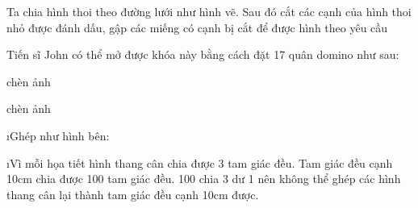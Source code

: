 \begin{Answer}{85}
		Ta chia hình thoi theo đường lưới như hình vẽ. Sau đó cắt các cạnh của hình thoi nhỏ được đánh dấu, gập các miếng có cạnh bị cắt để được hình theo yêu cầu
	
\end{Answer}
\begin{Answer}{86}
		Tiến sĩ John có thể mở được khóa này bằng cách đặt 17 quân domino như sau:
	
\end{Answer}
\begin{Answer}{87}
		chèn ảnh
	
\end{Answer}
\begin{Answer}{88}
		chèn ảnh
	
\end{Answer}
\begin{Answer}{89}
		\begin{enumerate}[a), leftmargin=*]
			\i Ghép như hình bên:
			
			\i Vì mỗi họa tiết hình thang cân chia được 3 tam giác đều. Tam giác đều cạnh 10cm chia được 100 tam giác đều. 100 chia 3 dư 1 nên không thể ghép các hình thang cân lại thành tam giác đều cạnh 10cm được.
		\end{enumerate}
	
\end{Answer}
